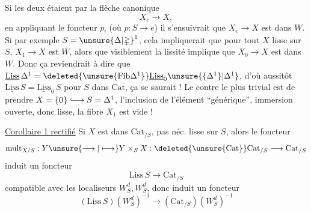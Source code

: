 Si les deux étaient   par la flèche canonique
\[
 X_e\longrightarrow X,
\]
en appliquant le foncteur $p_!$ (où $p:S\longrightarrow e$) il s'ensuivrait que $X_e\longrightarrow X$ est dans $W$. Si par exemple $S=\unsure{\Delta|\mathbb{\Delta}}^1$, cela impliquerait que pour tout $X$ lisse sur $S$, $X_1\longrightarrow X$ est  $W$, alors que visiblement la lissité implique que $X_0\longrightarrow X$ est dans $W$.  Donc ça reviendrait à dire que  $\underline{\mathrm{Liss}}\,\Delta^1=\deleted{\unsure{\mathrm{Fib}\Delta^1}}\underline{\mathrm{Liss}}_0\unsure{\{\Delta^1\}|\Delta^1}$, d'où aussitôt $\underline{\mathrm{Liss}}\,S=\underline{\mathrm{Liss}}_0\,S$  pour  $S$ dans $\mathrm{Cat}$, ça se saurait ! Le contre  le plus trivial est de prendre $X=\{0\}\lhook\joinrel\longrightarrow S=\Delta^1$, l'inclusion de l'élément ``générique'', immersion ouverte, donc lisse, la fibre  $X_1$ est vide !

\uline{Corollaire 1 rectifié} Si $X$ est dans $\mathrm{Cat}_{/S}$, pas néc. lisse sur $S$, alors le foncteur
\[
 \mathrm{mult}_{X/S}:Y\unsure{\longrightarrow|\longmapsto} Y\times_S X:\deleted{\unsure{\mathrm{Cat}}}\mathrm{Cat}_{/S}\longrightarrow\mathrm{Cat}_{/S}
\]
induit un foncteur
\[
 \underline{\mathrm{Liss}}\,S\longrightarrow\mathrm{Cat}_{/S}
\]
compatible avec les localiseurs $W_S^d,W_S^d$, donc induit un foncteur
\[
 (\underline{\mathrm{Liss}}\,S)(W_S^d)^{-1}\longrightarrow(\mathrm{Cat}_{/S})(W_S^d)^{-1}
\]
